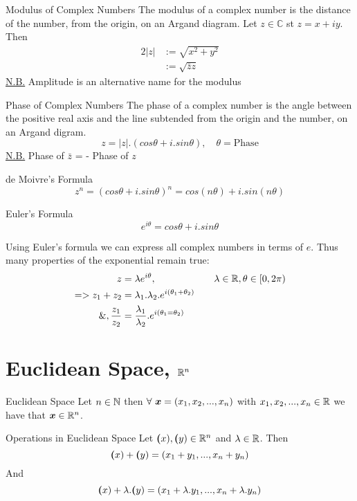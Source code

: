 \documentclass[11pt,a4paper]{article}
\begin{document}
\subtitle{Definition 1.15 - }{Modulus of Complex Numbers}
The modulus of a complex number is the distance of the number, from the origin, on an Argand diagram.
Let $z \in \mathbb{C}$ st $z = x + iy$. \\
Then \begin{alignat*}{2}
  |z| &:= \sqrt{x^2 + y^2} \\
  &:= \sqrt{\bar{z}z}
\end{alignat*}
\underline{N.B.} Amplitude is an alternative name for the modulus \\

\subtitle{Definition 1.16 - }{Phase of Complex Numbers}
The phase of a complex number is the angle between the positive real axis and the line subtended from the origin and the number, on an Argand digram.$$z = |z|.(cos\theta + i.sin\theta), \quad \theta = \mathrm{Phase}$$
\underline{N.B.} Phase of $\bar{z}$ = - Phase of $z$ \\

\subtitle{Theorem 1.17 - }{de Moivre's Formula}
$$z^n = (cos\theta +i.sin\theta)^n = cos(n\theta)+i.sin(n\theta)$$

\subtitle{Theorem 1.18 - }{Euler's Formula}
$$e^{i\theta} = cos\theta + i.sin\theta$$

\subtitle{Remark 1.19}{}
Using Euler's formula we can express all complex numbers in terms of $e$. Thus many properties of the exponential remain true:
\begin{alignat*}{2}
  z &= \lambda e^{i\theta}, && \quad \lambda \in \mathbb{R} , \theta \in \left[0, 2\pi\right) \\
  => z_1 + z_2 &= \lambda_1 . \lambda_2. e^{i(\theta_1 + \theta_2)} \\
  \&, \frac{z_1}{z_2} &= \frac{\lambda_1}{\lambda_2}.e^{i(\theta_1 = \theta_2)}
\end{alignat*}

\newpage
\section{Euclidean Space, $\mathbb{R}^n$}
%
\subtitle{Definition 2.01 - }{Euclidean Space}
Let $n \in \mathbb{N}$ then $\forall\ \boldsymbol{x} = (x_1, x_2, ... , x_n)$ with $x_1, x_2, ... , x_n \in \mathbb{R}$ we have that $\boldsymbol{x} \in \mathbb{R}^n$. \\

\subtitle{Theorem 2.02 - }{Operations in Euclidean Space}
Let $\boldsymbol{(}x), \boldsymbol{(}y) \in \mathbb{R}^n$ and $\lambda \in \mathbb{R}$.
Then $$\boldsymbol{(}x) + \boldsymbol{(}y) = (x_1 + y_1, ... , x_n + y_n)$$
And $$\boldsymbol{(}x) + \lambda.\boldsymbol{(}y) = (x_1 + \lambda.y_1, ... , x_n + \lambda.y_n)$$
\end{document}
